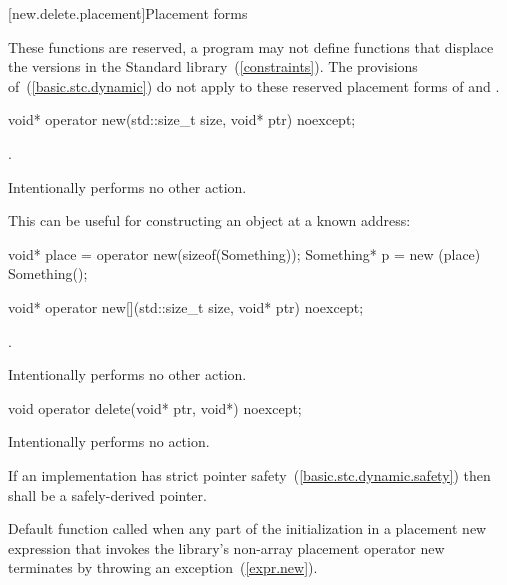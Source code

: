 [new.delete.placement]{Placement forms}

\pnum
These functions are reserved, a \Cpp program may not define functions that displace
the versions in the Standard \Cpp library~(\ref{constraints}).
The provisions of~(\ref{basic.stc.dynamic}) do not apply to these reserved
placement forms of  and .

%
\begin{itemdecl}
void* operator new(std::size_t size, void* ptr) noexcept;
\end{itemdecl}

\begin{itemdescr}
\pnum
\returns
{}.

\pnum
\notes
Intentionally performs no other action.

\pnum
\enterexample
This can be useful for constructing an object at a known address:

\begin{codeblock}
void* place = operator new(sizeof(Something));
Something* p = new (place) Something();
\end{codeblock}
\exitexample
\end{itemdescr}

%
\begin{itemdecl}
void* operator new[](std::size_t size, void* ptr) noexcept;
\end{itemdecl}

\begin{itemdescr}
\pnum
\returns
{}.

\pnum
\notes
Intentionally performs no other action.
\end{itemdescr}

%
\begin{itemdecl}
void operator delete(void* ptr, void*) noexcept;
\end{itemdecl}

\begin{itemdescr}
\pnum
\effects
Intentionally performs no action.

\pnum
\requires
If an implementation has strict pointer safety~(\ref{basic.stc.dynamic.safety})
then  shall be a safely-derived pointer.

\pnum
\notes
Default function called when any part of the initialization in a
placement new expression that invokes the library's
non-array placement operator new
terminates by throwing an exception~(\ref{expr.new}).
\end{itemdescr}

